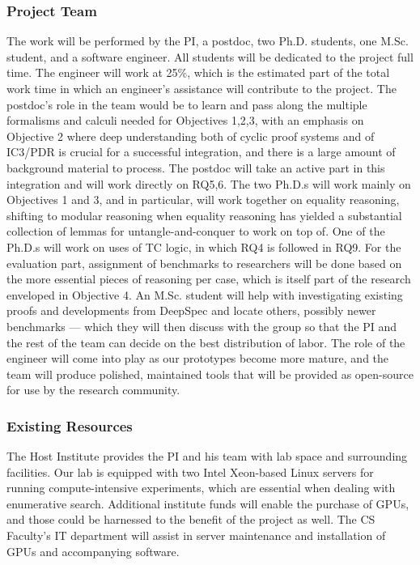 \subsubsection*{Project Team}
The work will be performed by the PI, a postdoc, two Ph.D. students, one M.Sc. student, and a software engineer.
All students will be dedicated to the project full time.
The engineer will work at 25\%, which is the estimated part of the total work time in which an engineer's assistance will contribute to the project.
The postdoc's role in the team would be to learn and pass along the multiple formalisms and calculi needed for Objectives 1,2,3, with an emphasis on Objective 2 where deep understanding both of cyclic proof systems and of IC3/PDR is crucial for a successful integration,
and there is a large amount of background material to process.
The postdoc will take an active part in this integration and will work directly on RQ5,6.
The two Ph.D.s will work mainly on Objectives 1 and 3, and in particular, will work together on equality reasoning, shifting to modular reasoning when equality reasoning has yielded a substantial collection of lemmas for untangle-and-conquer to work on top of.
One of the Ph.D.s will work on uses of TC logic, in which RQ4 is followed in RQ9.
For the evaluation part, assignment of benchmarks to researchers will be done based on the more essential pieces of reasoning per case,
which is itself part of the research enveloped in Objective 4.
An M.Sc. student will help with investigating existing proofs and developments from DeepSpec and locate others, possibly newer benchmarks --- which they will then discuss with the group so that the PI and the rest of the team can decide on the best distribution of labor.
The role of the engineer will come into play as our prototypes become more mature, and the team will produce polished, maintained tools that will be provided as open-source for use by the research community.

\subsubsection*{Existing Resources}

The Host Institute provides the PI and his team with lab space and surrounding facilities.
Our lab is equipped with two Intel Xeon-based Linux servers for running compute-intensive experiments, which are essential when dealing with enumerative search.
Additional institute funds will enable the purchase of GPUs, and those could be harnessed to the benefit of the project as well.
The CS Faculty's IT department will assist in server maintenance and installation of GPUs and accompanying software.